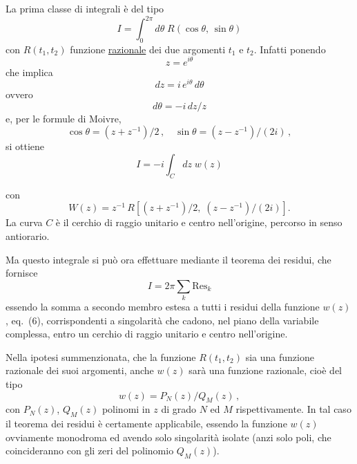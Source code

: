 \documentclass[11pt, a4paper]{book}
\numberwithin{equation}{section}
\begin{document}
La prima classe di integrali è del tipo
\begin{equation}
I = \int_0^{2\pi} d\theta\; R(\cos\theta,\, \sin\theta) \tag{1}
\end{equation}
con $R(t_1, t_2)$ funzione \underline{razionale} dei due argomenti $t_1$ e $t_2$. Infatti ponendo
\begin{equation}
z = e^{i\theta} \tag{2}
\end{equation}
che implica
\begin{equation}
dz = i\,e^{i\theta}\,d\theta \tag{3a}
\end{equation}
ovvero
\begin{equation}
d\theta = -i\,dz/z \tag{3b}
\end{equation}
e, per le formule di Moivre,
\begin{equation}
\cos\theta = (z+z^{-1})/2\,, \quad \sin\theta = (z-z^{-1})/(2i)\,, \tag{4}
\end{equation}
si ottiene
\begin{equation}
I = -i \int_C dz\; w(z) \tag{5}
\end{equation}

con
\begin{equation}
W(z) = z^{-1}\, R\!\left[(z+z^{-1})/2,\; (z-z^{-1})/(2i)\right]. \tag{6}
\end{equation}
La curva $C$ è il cerchio di raggio unitario e centro nell'origine, percorso in senso antiorario.

Ma questo integrale si può ora effettuare mediante il teorema dei residui, che fornisce
\begin{equation}
I = 2\pi \sum_k \mathrm{Res}_k \tag{7}
\end{equation}
essendo la somma a secondo membro estesa a tutti i residui della funzione $w(z)$, eq.\ (6), corrispondenti a singolarità che cadono, nel piano della variabile complessa, entro un cerchio di raggio unitario e centro nell'origine.

Nella ipotesi summenzionata, che la funzione $R(t_1, t_2)$ sia una funzione razionale dei suoi argomenti, anche $w(z)$ sarà una funzione razionale, cioè del tipo
\begin{equation}
w(z) = P_N(z) \big/ Q_M(z)\,, \tag{8}
\end{equation}
con $P_N(z)$, $Q_M(z)$ polinomi in $z$ di grado $N$ ed $M$ rispettivamente. In tal caso il teorema dei residui è certamente applicabile, essendo la funzione $w(z)$ ovviamente monodroma ed avendo solo singolarità isolate (anzi solo poli, che coincideranno con gli zeri del polinomio $Q_M(z)$).
\end{document}

